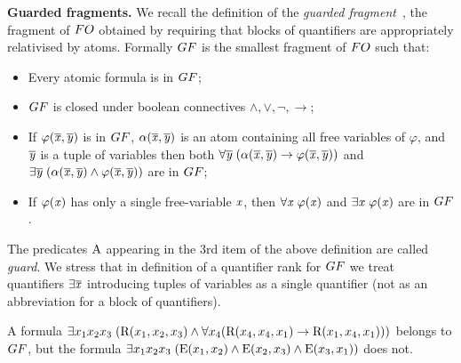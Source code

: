 \noindent \textbf{Guarded fragments.}
We recall the definition of the \emph{guarded fragment}~\cite[Sec. 4.1]{AndrekaNB98}, \ie the fragment of $\FO$ obtained by requiring that blocks of quantifiers are appropriately relativised by atoms.
Formally $\GF$ is the smallest fragment of $\FO$  such that:
\begin{itemize}\itemsep0em
    \item Every atomic formula is in $\GF$;
    \item $\GF$ is closed under boolean connectives $\land, \lor, \neg, \to$;
    \item If $\varphi(\overline{\mathit{x}}, \overline{\mathit{y}})$ is in $\GF$, $\alpha(\overline{\mathit{x}}, \overline{\mathit{y}})$ is an atom containing all free variables of $\varphi$, and $\overline{\mathit{y}}$ is a tuple of variables then both $\forall{\overline{\mathit{y}}} \; (\alpha(\overline{\mathit{x}}, \overline{\mathit{y}}) \to \varphi(\overline{\mathit{x}}, \overline{\mathit{y}}))$ and $\exists{\overline{\mathit{y}}} \; (\alpha(\overline{\mathit{x}}, \overline{\mathit{y}}) \land \varphi(\overline{\mathit{x}}, \overline{\mathit{y}}))$ are in $\GF$; 
    \item If $\varphi(\mathit{x})$ has only a single free-variable $\mathit{x}$, then $\forall{\mathit{x}}\; \varphi(\mathit{x})$ and $\exists{\mathit{x}}\; \varphi(\mathit{x})$ are in $\GF$.
\end{itemize}
The predicates $\mathrm{A}$ appearing in the 3rd item of the above definition are called \emph{guard}.
We stress that in definition of a quantifier rank for $\GF$ we treat quantifiers $\exists{\overline{\mathit{x}}}$ introducing tuples of variables as a single quantifier (not as an abbreviation for a block of quantifiers).

\begin{example}
A formula $\exists{x_{1}x_{2}x_{3}}\; (\mathrm{R}(x_{1}, x_{2}, x_{3}) \land \forall x_{4}(\mathrm{R}(x_{4}, x_{4}, x_{1}) \to \mathrm{R}(x_{1}, x_{4}, x_{1})))$ belongs to $\GF$, but the formula $\exists{x_{1}x_{2}x_{3}}\; (\mathrm{E}(x_{1}, x_{2}) \land \mathrm{E}(x_{2}, x_{3}) \land \mathrm{E}(x_{3}, x_{1}))$ does not.
\end{example}

